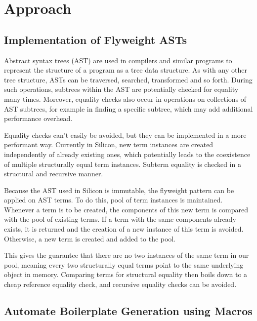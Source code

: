 \documentclass[11pt]{article}
\begin{document}
    \tableofcontents
    \newpage


    \newpage
    \section{Approach}

    \subsection{Implementation of Flyweight ASTs} \label{approach:flyweight}

    Abstract syntax trees (AST) are used in compilers and similar programs to represent
    the structure of a program as a tree data structure. As with any other tree structure,
    ASTs can be traversed, searched, transformed and so forth. During such operations,
    subtrees within the AST are potentially checked for equality many times.  Moreover, equality checks
    also occur in operations on collections of AST subtrees, for example in finding
    a specific subtree, which may add additional performance overhead.

    Equality checks can't easily be avoided, but they can be implemented in a more performant way.
    Currently in Silicon, new term instances are created independently of already existing ones, which potentially leads 
    to the coexistence of multiple structurally equal term instances. Subterm equality is checked in a
    structural and recursive manner.

    Because the AST used in Silicon is immutable, the flyweight pattern \cite{patterns}
    can be applied on AST terms.
    To do this, pool of term instances is maintained. Whenever a term
    is to be created, the components of this new term is compared with the
    pool of existing terms. If a term with the same components already exists, it is returned and
    the creation of a new instance of this term is avoided. Otherwise, a new term is created and added to
    the pool.

    This gives the guarantee that there are no two instances of the
    same term in our pool, meaning every two structurally equal terms point to the same
    underlying object in memory. Comparing terms for structural equality then boils
    down to a cheap reference equality check, and recursive equality checks can be avoided.

    \subsection{Automate Boilerplate Generation using Macros} \label{approach:macros}
\end{document}
